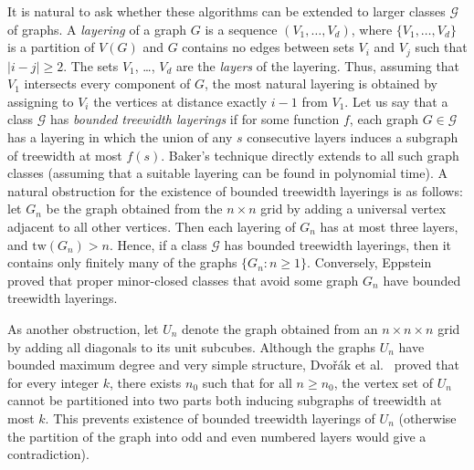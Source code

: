 \documentclass[a4paper,11pt]{article}
\newcommand{\GG}{{\mathcal G}}
\newcommand{\tw}{\text{tw}}
\begin{document}
It is natural to ask whether these algorithms can be extended to larger classes $\GG$ of graphs.
A \emph{layering} of a graph $G$ is a sequence $(V_1,\ldots, V_d)$, where $\{V_1,\ldots,V_d\}$
is a partition of $V(G)$ and $G$ contains no edges between sets $V_i$ and $V_j$ such that $|i-j|\ge 2$.
The sets $V_1$, \ldots, $V_d$ are the \emph{layers} of the layering.
Thus, assuming that $V_1$ intersects every component of $G$, the most natural layering is obtained by assigning to $V_i$
the vertices at distance exactly $i-1$ from $V_1$.
Let us say that a class $\GG$ has \emph{bounded treewidth layerings} if for some function $f$,
each graph $G\in\GG$ has a layering in which the union of any $s$ consecutive layers induces a subgraph of treewidth at most $f(s)$.
Baker's technique directly extends to all such graph classes (assuming that a suitable layering can be found
in polynomial time).  A natural obstruction for the existence of bounded treewidth layerings is as follows:
let $G_n$ be the graph obtained from the $n\times n$ grid by adding a universal vertex adjacent to all other vertices.
Then each layering of $G_n$ has at most three layers, and $\tw(G_n)>n$.  Hence, if a class $\GG$ has bounded treewidth layerings,
then it contains only finitely many of the graphs $\{G_n:n\ge 1\}$.  Conversely, Eppstein~\cite{eppstein00} proved that
proper minor-closed classes that avoid some graph $G_n$ have bounded treewidth layerings.

As another obstruction, let $U_n$ denote the graph obtained from an $n\times n\times n$ grid by adding all diagonals to its unit
subcubes.  Although the graphs $U_n$ have bounded maximum degree and very simple structure, 
Dvo\v{r}\'ak et al.~\cite{gridtw} proved that for every integer $k$, there exists $n_0$ such that for all $n\ge n_0$,
the vertex set of $U_n$ cannot be partitioned into two parts both inducing subgraphs of treewidth at most $k$.
This prevents existence of bounded treewidth layerings of $U_n$ (otherwise the partition of the graph into odd and even numbered layers
would give a contradiction).
\end{document}
